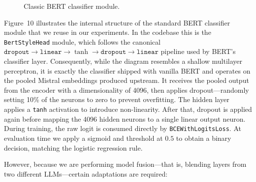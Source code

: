 \documentclass[12pt]{article}
\begin{document}
\begin{figure}[H]
\begin{adjustwidth}{-0.3cm}{0cm}
\begin{minipage}{1\textwidth}
\end{minipage}
\end{adjustwidth}
\caption{Classic BERT classifier module.}
\label{fig:bert-classifier-module}
\end{figure}

Figure~10 illustrates the internal structure of the standard BERT classifier module that we reuse in our experiments. 
In the codebase this is the \texttt{BertStyleHead} module, which follows the canonical $\texttt{dropout} \rightarrow \texttt{linear} \rightarrow \tanh \rightarrow \texttt{dropout} \rightarrow \texttt{linear}$ pipeline used by BERT's classifier layer. 
Consequently, while the diagram resembles a shallow multilayer perceptron, it is exactly the classifier shipped with vanilla BERT and operates on the pooled Mistral embeddings produced upstream.
It receives the pooled output from the encoder with a dimensionality of 4096, then applies dropout\;---\;randomly setting 10\% of the neurons to zero to prevent overfitting. 
The hidden layer applies a \texttt{tanh} activation to introduce non-linearity. 
After that, dropout is applied again before mapping the 4096 hidden neurons to a single linear output neuron. 
During training, the raw logit is consumed directly by \texttt{BCEWithLogitsLoss}. 
At evaluation time we apply a sigmoid and threshold at $0.5$ to obtain a binary decision, matching the logistic regression rule.

However, because we are performing model fusion\;---\;that is, blending layers from two different LLMs\;---\;certain adaptations are required:
\end{document}
